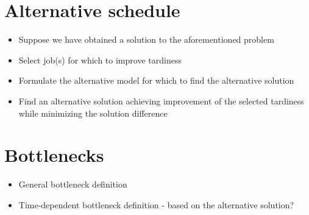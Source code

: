 \section{Alternative schedule}

\begin{itemize}
    \item Suppose we have obtained a solution to the aforementioned problem
    \item Select job(s) for which to improve tardiness
    \item Formulate the alternative model for which to find the alternative solution
    \item Find an alternative solution achieving improvement of the selected tardiness while
        minimizing the solution difference
\end{itemize}

\section{Bottlenecks}

\begin{itemize}
    \item General bottleneck definition
    \item Time-dependent bottleneck definition - based on the alternative solution?
\end{itemize}

